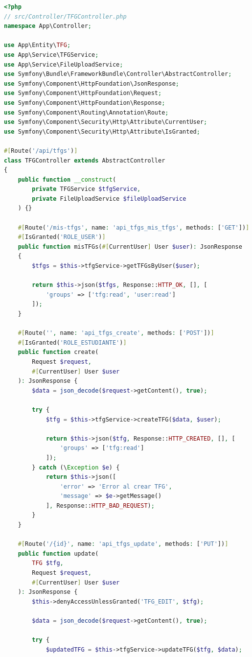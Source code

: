 \documentclass[12pt,a4paper,oneside]{report}
\begin{document}
\begin{lstlisting}[language=PHP]
<?php
// src/Controller/TFGController.php
namespace App\Controller;

use App\Entity\TFG;
use App\Service\TFGService;
use App\Service\FileUploadService;
use Symfony\Bundle\FrameworkBundle\Controller\AbstractController;
use Symfony\Component\HttpFoundation\JsonResponse;
use Symfony\Component\HttpFoundation\Request;
use Symfony\Component\HttpFoundation\Response;
use Symfony\Component\Routing\Annotation\Route;
use Symfony\Component\Security\Http\Attribute\CurrentUser;
use Symfony\Component\Security\Http\Attribute\IsGranted;

#[Route('/api/tfgs')]
class TFGController extends AbstractController
{
    public function __construct(
        private TFGService $tfgService,
        private FileUploadService $fileUploadService
    ) {}

    #[Route('/mis-tfgs', name: 'api_tfgs_mis_tfgs', methods: ['GET'])]
    #[IsGranted('ROLE_USER')]
    public function misTFGs(#[CurrentUser] User $user): JsonResponse
    {
        $tfgs = $this->tfgService->getTFGsByUser($user);

        return $this->json($tfgs, Response::HTTP_OK, [], [
            'groups' => ['tfg:read', 'user:read']
        ]);
    }

    #[Route('', name: 'api_tfgs_create', methods: ['POST'])]
    #[IsGranted('ROLE_ESTUDIANTE')]
    public function create(
        Request $request, 
        #[CurrentUser] User $user
    ): JsonResponse {
        $data = json_decode($request->getContent(), true);

        try {
            $tfg = $this->tfgService->createTFG($data, $user);

            return $this->json($tfg, Response::HTTP_CREATED, [], [
                'groups' => ['tfg:read']
            ]);
        } catch (\Exception $e) {
            return $this->json([
                'error' => 'Error al crear TFG',
                'message' => $e->getMessage()
            ], Response::HTTP_BAD_REQUEST);
        }
    }

    #[Route('/{id}', name: 'api_tfgs_update', methods: ['PUT'])]
    public function update(
        TFG $tfg,
        Request $request,
        #[CurrentUser] User $user
    ): JsonResponse {
        $this->denyAccessUnlessGranted('TFG_EDIT', $tfg);

        $data = json_decode($request->getContent(), true);

        try {
            $updatedTFG = $this->tfgService->updateTFG($tfg, $data);


\end{lstlisting}
\end{document}

